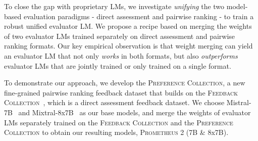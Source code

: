 \documentclass[11pt]{article}
\begin{document}

To close the gap with proprietary LMs, we investigate \textit{unifying} the two model-based evaluation paradigms - direct assessment and pairwise ranking - to train a robust unified evaluator LM. We propose a recipe based on merging the weights of two evaluator LMs trained separately on direct assessment and pairwise ranking formats. Our key empirical observation is that weight merging can yield an evaluator LM that not only \textit{works} in both formats, but also \textit{outperforms} evaluator LMs that are jointly trained or only trained on a single format.

To demonstrate our approach, we develop the \textsc{Preference Collection}, a new fine-grained pairwise ranking feedback dataset that builds on the \textsc{Feedback Collection}~\cite{kim2023prometheus}, which is a direct assessment feedback dataset. We choose Mistral-7B~\citep{jiang2023mistral} and Mixtral-8x7B~\citep{jiang2024mixtral} as our base models, and merge the weights of evaluator LMs separately trained on the \textsc{Feedback Collection} and the \textsc{Preference Collection} to obtain our resulting models, \textsc{Prometheus 2} (7B \& 8x7B).


\end{document}

